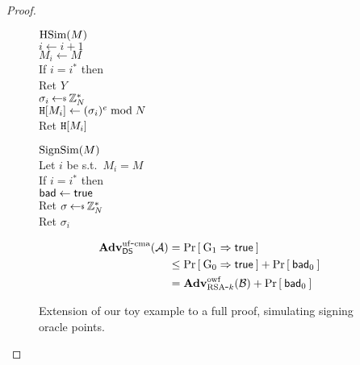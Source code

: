 \begin{proof}
\begin{figure}
{\underline{$\textnormal{HSim}(M)$}\\
$i \gets i+1$\\
$M_i \gets M$\\
If $i = i^*$ then\\
\myInd Ret $Y$\\
$\sigma_i \getsr \Z_N^*$\\
$\mathtt{H}[M_i] \gets (\sigma_i)^e \bmod N$\\
Ret $\mathtt{H}[M_i]$\medskip

\underline{$\textnormal{SignSim}(M)$}\\
Let $i$ be s.t.~$M_i = M$\\
If $i = i^*$ then\\
\myInd $\mathsf{bad}\gets\mathsf{true}$\\
\myInd Ret $\sigma \getsr \Z_N^*$\\
Ret $\sigma_i$
}


\begin{align*}
  \mathbf{Adv}^{\mathrm{uf\mbox{-} cma}}_{{\mathsf{DS}}}({\mathcal A}) &= \Pr\left[\: {{\textnormal G}}_1\Rightarrow\mathsf{true} \:\right]\\
      &\le \Pr\left[\: {{\textnormal G}}_0\Rightarrow\mathsf{true} \:\right] + \Pr\left[\: \mathsf{bad}_0 \:\right]\\
      &= \mathbf{Adv}^{\mathrm{owf}}_{{\textnormal{RSA}\mbox{-} k}}({\mathcal B}) + \Pr\left[\: \mathsf{bad}_0 \:\right]
\end{align*}

  \caption{Extension of our toy example to a full proof, simulating signing oracle points.}
\label{fig:fulldomainsignproof}
\end{figure}

\end{proof}

